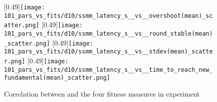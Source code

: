 \begin{figure}[!h]
	\centering
	[0.49\linewidth]{\texttt{[image: 101\_pars\_vs\_fits/d10/ssmm\_latency\_s\_\_vs\_\_overshoot(mean)\_scatter.png]}}
	[0.49\linewidth]{\texttt{[image: 101\_pars\_vs\_fits/d10/ssmm\_latency\_s\_\_vs\_\_round\_stable(mean)\_scatter.png]}}
	[0.49\linewidth]{\texttt{[image: 101\_pars\_vs\_fits/d10/ssmm\_latency\_s\_\_vs\_\_stdev(mean)\_scatter.png]}}
	[0.49\linewidth]{\texttt{[image: 101\_pars\_vs\_fits/d10/ssmm\_latency\_s\_\_vs\_\_time\_to\_reach\_new\_fundamental(mean)\_scatter.png]}}
	\caption{Correlation between \sclatencys{} and the four fitness measures in experiment \dten}
	
\end{figure}

\begin{comment}
\section{Scatter plots for \deleven}
\begin{figure}
\centering
\texttt{[image: 103\_scatter\_manual\_outlier/d11/d.png]}
\caption{Scatter plot of $\log \stdev$, $\log \roundstable$ and \timetoreachnewfundamental}
\end{figure}

\begin{figure}
\centering
\texttt{[image: 103\_scatter\_manual\_outlier/d11/l.png]}
\caption{Scatter plot of $\log \stdev$, $\log \roundstable$ and \overshoot}
\end{figure}

\begin{figure}
\centering
\texttt{[image: 103\_scatter\_manual\_outlier/d11/f.png]}
\caption{Scatter plot of \roundstable, \timetoreachnewfundamental and \stdev}
\end{figure}
\begin{figure}
\centering
\texttt{[image: 103\_scatter\_manual\_outlier/d11/j.png]}
\caption{Scatter plot of \overshoot, $\log \roundstable$ and \timetoreachnewfundamental}
\end{figure}
\end{comment}
